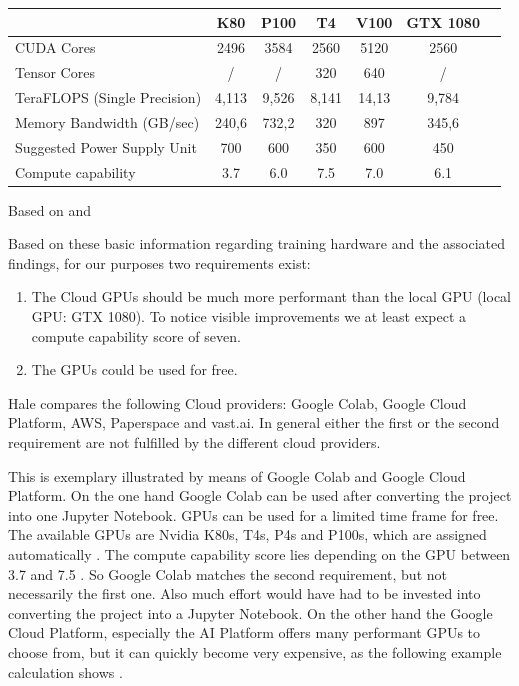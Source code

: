 \begin{center}
	\begin{tabular}[H]{l|c|c|c|c|c|c}
		& K80 & P100 & T4 & V100 & GTX 1080 \\
		\hline
		CUDA Cores & 2496 & 3584 & 2560 & 5120 & 2560 \\
		Tensor Cores & / & / & 320 & 640 & / \\
		TeraFLOPS (Single Precision) & 4,113 & 9,526 & 8,141 & 14,13 & 9,784  \\
		Memory Bandwidth (GB/sec) & 240,6 & 732,2 & 320 & 897 & 345,6 \\
		Suggested Power Supply Unit & 700 & 600 & 350 & 600 & 450 \\
		Compute capability & 3.7 & 6.0 & 7.5 & 7.0 & 6.1 \\ 
	\end{tabular}
	\label{table:hardware}
	Based on \cite{techpowerupeditorTechPowerUp} and \cite{nvidiaeditorCUDAGPUs2012}
\end{center}


Based on these basic information regarding training hardware and the associated findings, for our purposes two requirements exist:
\begin{enumerate}
	\item The Cloud GPUs should be much more performant than the local GPU (local GPU: GTX 1080). To notice visible improvements we at least expect a compute capability score of seven.
	\item The GPUs could be used for free.
\end{enumerate}

Hale \cite{haleBestDealsDeep2019} compares the following Cloud providers: Google Colab, Google Cloud Platform, AWS, Paperspace and vast.ai. In general either the first or the second requirement are not fulfilled by the different cloud providers. 

This is exemplary illustrated by means of Google Colab and Google Cloud Platform. 
On the one hand Google Colab can be used after converting the project into one Jupyter Notebook. GPUs can be used for a limited time frame for free. The available GPUs are Nvidia K80s, T4s, P4s and P100s, which are assigned automatically \cite{googleeditorColaboratoryGoogleFAQ}. The compute capability score lies depending on the GPU between 3.7 and 7.5 \cite{nvidiaeditorCUDAGPUs2012}. So Google Colab matches the second requirement, but not necessarily the first one. Also much effort would have had to be invested into converting the project into a Jupyter Notebook. 
On the other hand the Google Cloud Platform, especially the AI Platform offers many performant GPUs to choose from, but it can quickly become very expensive, as the following example calculation shows \cite{googleeditorGPUsTrainierenModellen}. 

